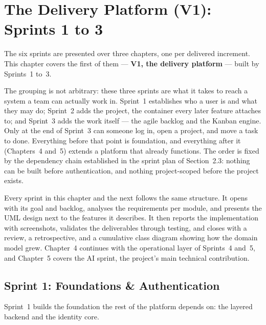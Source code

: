 
\chapter{The Delivery Platform (V1): Sprints 1 to 3}

The six sprints are presented over three chapters, one per delivered increment. This chapter
covers the first of them --- \textbf{V1, the delivery platform} --- built by Sprints~1 to~3.

The grouping is not arbitrary: these three sprints are what it takes to reach a system a team can
actually work in. Sprint~1 establishes who a user is and what they may do; Sprint~2 adds the
project, the container every later feature attaches to; and Sprint~3 adds the work itself --- the
agile backlog and the Kanban engine. Only at the end of Sprint~3 can someone log in, open a
project, and move a task to done. Everything before that point is foundation, and everything
after it (Chapters~4 and~5) extends a platform that already functions. The order is fixed by the
dependency chain established in the sprint plan of Section~2.3: nothing can be built before
authentication, and nothing project-scoped before the project exists.

Every sprint in this chapter and the next follows the same structure. It opens with its goal and
backlog, analyses the requirements per module, and presents the UML design next to the features
it describes. It then reports the implementation with screenshots, validates the deliverables
through testing, and closes with a review, a retrospective, and a cumulative class diagram
showing how the domain model grew. Chapter~4 continues with the operational layer of Sprints~4
and~5, and Chapter~5 covers the AI sprint, the project's main technical contribution.


\clearpage
\section{Sprint 1: Foundations \& Authentication}

Sprint~1 builds the foundation the rest of the platform depends on: the layered backend and the
identity core.

